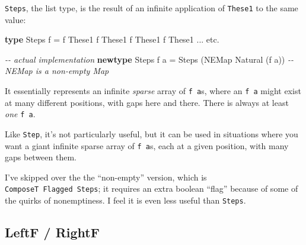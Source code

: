 \documentclass[]{article}
\newenvironment{Shaded}{}{}
\newcommand{\CommentTok}[1]{\textcolor[rgb]{0.38,0.63,0.69}{\textit{#1}}}
\newcommand{\DataTypeTok}[1]{\textcolor[rgb]{0.56,0.13,0.00}{#1}}
\newcommand{\KeywordTok}[1]{\textcolor[rgb]{0.00,0.44,0.13}{\textbf{#1}}}
\newcommand{\NormalTok}[1]{#1}
\newcommand{\OperatorTok}[1]{\textcolor[rgb]{0.40,0.40,0.40}{#1}}
\newcommand{\OtherTok}[1]{\textcolor[rgb]{0.00,0.44,0.13}{#1}}
\begin{document}
\begin{itemize}
  \texttt{Steps}, the list type, is the result of an infinite application of
  \texttt{These1} to the same value:

\begin{Shaded}
\begin{Highlighting}[]
\KeywordTok{type} \DataTypeTok{Steps}\NormalTok{ f }\OtherTok{=}\NormalTok{ f }\OtherTok{\textasciigrave{}These1\textasciigrave{}}\NormalTok{ f }\OtherTok{\textasciigrave{}These1\textasciigrave{}}\NormalTok{ f }\OtherTok{\textasciigrave{}These1\textasciigrave{}}\NormalTok{ f }\OtherTok{\textasciigrave{}These1\textasciigrave{}} \OperatorTok{...}\NormalTok{ etc}\OperatorTok{.}

\CommentTok{{-}{-} actual implementation}
\KeywordTok{newtype} \DataTypeTok{Steps}\NormalTok{ f a }\OtherTok{=} \DataTypeTok{Steps}\NormalTok{ (}\DataTypeTok{NEMap} \DataTypeTok{Natural}\NormalTok{ (f a))}
                \CommentTok{{-}{-} NEMap is a non{-}empty Map}
\end{Highlighting}
\end{Shaded}

  It essentially represents an infinite \emph{sparse} array of \texttt{f\ a}s,
  where an \texttt{f\ a} might exist at many different positions, with gaps here
  and there. There is always at least \emph{one} \texttt{f\ a}.

  Like \texttt{Step}, it's not particularly useful, but it can be used in
  situations where you want a giant infinite sparse array of \texttt{f\ a}s,
  each at a given position, with many gaps between them.

  I've skipped over the the ``non-empty'' version, which is
  \texttt{ComposeT\ Flagged\ Steps}; it requires an extra boolean ``flag''
  because of some of the quirks of nonemptiness. I feel it is even less useful
  than \texttt{Steps}.
\end{itemize}

\subsection{LeftF / RightF}\label{leftf-rightf}
\end{document}
